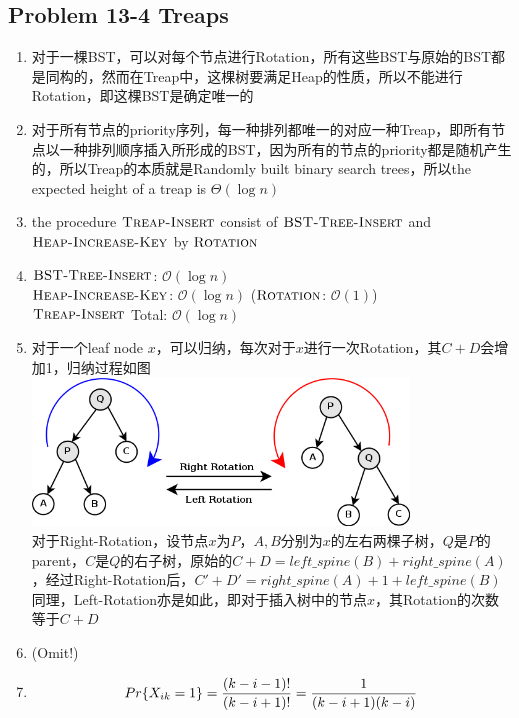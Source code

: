 \subsection*{Problem 13-4 Treaps}
\begin{enumerate}
	\item	对于一棵BST，可以对每个节点进行Rotation，所有这些BST与原始的BST都是同构的，然而在Treap中，这棵树要满足Heap的性质，所以不能进行Rotation，即这棵BST是确定唯一的
	\item	对于所有节点的priority序列，每一种排列都唯一的对应一种Treap，即所有节点以一种排列顺序插入所形成的BST，因为所有的节点的priority都是随机产生的，所以Treap的本质就是Randomly built binary search trees，所以the expected height of a treap is $\Theta(\log{n})$
	\item	the procedure $\textnormal{\scshape Treap-Insert}$ consist of $\textnormal{\scshape BST-Tree-Insert}$ and $\textnormal{\scshape Heap-Increase-Key}$ by $\textnormal{\scshape Rotation}$
	\item	$\textnormal{\scshape BST-Tree-Insert}$: $\mathcal{O}(\log{n})$ \\
		$\textnormal{\scshape Heap-Increase-Key}$: $\mathcal{O}(\log{n})$ ($\textnormal{\scshape Rotation}$: $\mathcal{O}(1)$) \\
		$\textnormal{\scshape Treap-Insert}$ Total: $\mathcal{O}(\log{n})$
	\item	对于一个leaf node $x$，可以归纳，每次对于$x$进行一次Rotation，其$C + D$会增加1，归纳过程如图 \\
		\includegraphics[width=10cm]{chapter13/Tree_rotation.png} \\
		对于Right-Rotation，设节点$x$为$P$，$A, B$分别为$x$的左右两棵子树，$Q$是$P$的parent，$C$是$Q$的右子树，原始的$C + D = left\_spine(B) + right\_spine(A)$，经过Right-Rotation后，$C' + D' = right\_spine(A) + 1 + left\_spine(B)$ \\
		同理，Left-Rotation亦是如此，即对于插入树中的节点$x$，其Rotation的次数等于$C + D$
	\item	(Omit!)
	\item	\begin{equation} \notag
			Pr\{X_{ik} = 1\} = \frac{(k - i - 1)!}{(k - i + 1)!} = \frac{1}{(k - i + 1)(k - i)}
		\end{equation}

\end{enumerate}
